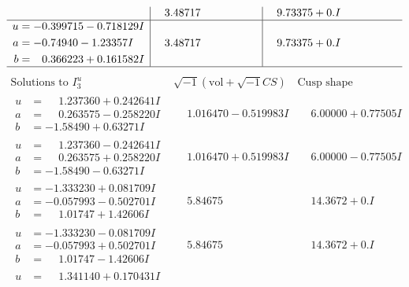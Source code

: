 \documentclass[1p]{elsarticle_modified}
\theoremstyle{definition}
\newcommand{\I}{\sqrt{-1}}
\begin{document}
$$\begin{array}{c|c|c}
 & \phantom{-}3.48717\phantom{ +0.000000I} & \phantom{-}9.73375 + 0. I\phantom{ +0.000000I} \\ \hline\begin{aligned}
u &= -0.399715 - 0.718129 I \\
a &= -0.74940 - 1.23357 I \\
b &= \phantom{-}0.366223 + 0.161582 I\end{aligned}
 & \phantom{-}3.48717\phantom{ +0.000000I} & \phantom{-}9.73375 + 0. I\phantom{ +0.000000I}\\
 \hline 
 \end{array}$$\newpage$$\begin{array}{c|c|c}  
\text{Solutions to }I^u_{3}& \I (\text{vol} + \sqrt{-1}CS) & \text{Cusp shape}\\
 \hline 
\begin{aligned}
u &= \phantom{-}1.237360 + 0.242641 I \\
a &= \phantom{-}0.263575 - 0.258220 I \\
b &= -1.58490 + 0.63271 I\end{aligned}
 & \phantom{-}1.016470 - 0.519983 I & \phantom{-}6.00000 + 0.77505 I \\ \hline\begin{aligned}
u &= \phantom{-}1.237360 - 0.242641 I \\
a &= \phantom{-}0.263575 + 0.258220 I \\
b &= -1.58490 - 0.63271 I\end{aligned}
 & \phantom{-}1.016470 + 0.519983 I & \phantom{-}6.00000 - 0.77505 I \\ \hline\begin{aligned}
u &= -1.333230 + 0.081709 I \\
a &= -0.057993 - 0.502701 I \\
b &= \phantom{-}1.01747 + 1.42606 I\end{aligned}
 & \phantom{-}5.84675\phantom{ +0.000000I} & \phantom{-}14.3672 + 0. I\phantom{ +0.000000I} \\ \hline\begin{aligned}
u &= -1.333230 - 0.081709 I \\
a &= -0.057993 + 0.502701 I \\
b &= \phantom{-}1.01747 - 1.42606 I\end{aligned}
 & \phantom{-}5.84675\phantom{ +0.000000I} & \phantom{-}14.3672 + 0. I\phantom{ +0.000000I} \\ \hline\begin{aligned}
u &= \phantom{-}1.341140 + 0.170431 I \\

\end{aligned}
\end{array}$$
\end{document}
